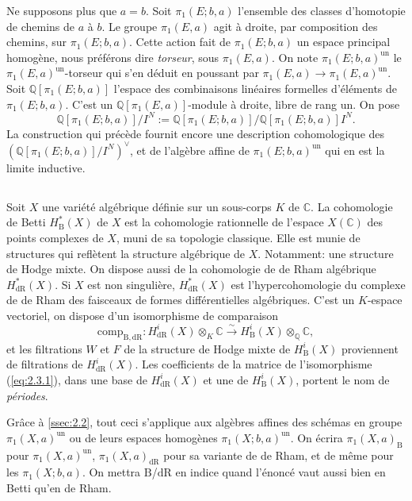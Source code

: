 \documentclass[11pt,a4paper]{article}
\theoremstyle{plain}
\theoremstyle{definition}
\newcommand{\Q}{\mathbb{Q}}
\newcommand{\C}{\mathbb{C}}
\newcommand{\dR}{\mathrm{dR}}
\newcommand{\B}{\mathrm{B}}
\newcommand{\comp}{\mathrm{comp}}
\begin{document}
Ne supposons plus que $a = b$. Soit $\pi_1(E;b,a)$ l'ensemble des classes d'homotopie de chemins de $a$ \`a $b$. Le groupe $\pi_1(E,a)$ agit \`a droite, par composition des chemins, sur $\pi_1(E;b,a)$. Cette action fait de $\pi_1(E;b,a)$ un espace principal homog\`ene, nous pr\'ef\'erons dire \emph{torseur}, sous $\pi_1(E,a)$. On note $\pi_1(E;b,a)^{\mathrm{un}}$ le $\pi_1(E,a)^{\mathrm{un}}$-torseur qui s'en d\'eduit en poussant par $\pi_1(E,a) \to \pi_1(E,a)^{\mathrm{un}}$. Soit $\Q[\pi_1(E;b,a)]$ l'espace des combinaisons lin\'eaires formelles d'\'el\'ements de $\pi_1(E;b,a)$. C'est un $\Q[\pi_1(E,a)]$-module \`a droite, libre de rang un. On pose
\[
\Q[\pi_1(E;b,a)]/I^N := \Q[\pi_1(E;b,a)]/\Q[\pi_1(E;b,a)]I^N.
\]
La construction qui pr\'ec\`ede fournit encore une description cohomologique des $(\Q[\pi_1(E;b,a)]/I^N)^\vee$, et de l'alg\`ebre affine de $\pi_1(E;b,a)^{\mathrm{un}}$ qui en est la limite inductive.

\subsection{}\label{ssec:2.3}

Soit $X$ une vari\'et\'e alg\'ebrique d\'efinie sur un sous-corps $K$ de $\C$. La cohomologie de Betti $H_{\B}^*(X)$ de $X$ est la cohomologie rationnelle de l'espace $X(\C)$ des points complexes de $X$, muni de sa topologie classique. Elle est munie de structures qui refl\`etent la structure alg\'ebrique de $X$. Notamment: une structure de Hodge mixte. On dispose aussi de la cohomologie de de Rham alg\'ebrique $H_{\dR}^*(X)$. Si $X$ est non singuli\`ere, $H_{\dR}^*(X)$ est l'hypercohomologie du complexe de de Rham des faisceaux de formes diff\'erentielles alg\'ebriques. C'est un $K$-espace vectoriel, on dispose d'un isomorphisme de comparaison
\begin{equation}\label{eq:2.3.1}
\comp_{\B,\dR} : H_{\dR}^i(X) \otimes_K \C \xrightarrow{\sim} H_{\B}^i(X) \otimes_{\Q} \C,
\end{equation}
et les filtrations $W$ et $F$ de la structure de Hodge mixte de $H_{\B}^i(X)$ proviennent de filtrations de $H_{\dR}^i(X)$. Les coefficients de la matrice de l'isomorphisme (\ref{eq:2.3.1}), dans une base de $H_{\dR}^i(X)$ et une de $H_{\B}^i(X)$, portent le nom de \emph{p\'eriodes}.

Gr\^ace \`a \ref{ssec:2.2}, tout ceci s'applique aux alg\`ebres affines des sch\'emas en groupe $\pi_1(X,a)^{\mathrm{un}}$ ou de leurs espaces homog\`enes $\pi_1(X;b,a)^{\mathrm{un}}$. On \'ecrira $\pi_1(X,a)_{\B}$ pour $\pi_1(X,a)^{\mathrm{un}}$, $\pi_1(X,a)_{\dR}$ pour sa variante de de Rham, et de m\^eme pour les $\pi_1(X;b,a)$. On mettra $\B$/$\dR$ en indice quand l'\'enonc\'e vaut aussi bien en Betti qu'en de Rham.
\end{document}
